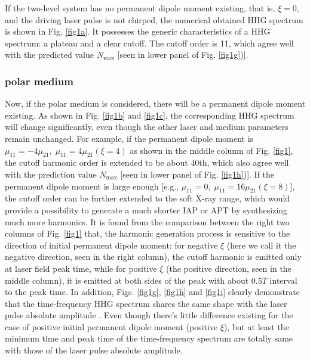 \documentclass[10pt,letterpaper]{article}
\begin{document}
If the two-level system has no permanent dipole moment existing, that is, $\xi=0$, and the driving laser pulse is not chirped, the numerical obtained HHG spectrum is shown in Fig. \ref{fig1a}. It possesses the generic characteristics of a HHG spectrum: a plateau and a clear cutoff. The cutoff order is 11, which agree well with the predicted value $N_{\textrm{max}}$ [seen in lower panel of Fig. \ref{fig1g})].
\subsubsection{polar medium}
Now, if the polar medium is considered, there will be a permanent dipole moment existing. As shown in Fig. \ref{fig1b} and \ref{fig1c}, the corresponding HHG spectrum will change significantly, even though the other laser and medium parameters remain unchanged. For example, if the permanent dipole moment is $\mu_{11} =-4\mu_{21},\;\mu_{11} =4\mu_{21}(\xi=4)$ as shown in the middle column of Fig. \ref{fig1}, the cutoff harmonic order is extended to be about 40th, which also agree well with the prediction value $N_\textrm{max}$ [seen in lower panel of Fig. \ref{fig1h})]. If the permanent dipole moment is large enough [e.g., $\mu_{11} =0,\;\mu_{11} =16\mu_{21}(\xi=8)$], the cutoff order can be further extended to the soft X-ray range, which would provide a possibility to generate a much shorter IAP or APT by synthesizing much more harmonics. It is found from the comparison between the right two columns of Fig. \ref{fig1} that, the harmonic generation process is sensitive to the direction of initial permanent dipole moment: for negative $\xi$ (here we call it the negative direction, seen in the right column), the cutoff harmonic is emitted only at laser field peak time, while for positive $\xi$ (the positive direction, seen in the middle column), it is emitted at both sides of the peak with about $0.5T$ interval to the peak time. In addition, Figs. \ref{fig1g}, \ref{fig1h} and \ref{fig1i} clearly demonstrate that the time-frequency HHG spectrum shares the same shape with the laser pulse absolute amplitude \cite{CuiNi2010NJP-wavelet}. Even though there's little difference existing for the case of positive initial permanent dipole moment (positive $\xi$), but at least the minimum time and peak time of the time-frequency spectrum are totally same with those of the laser pulse absolute amplitude.      
\end{document}
